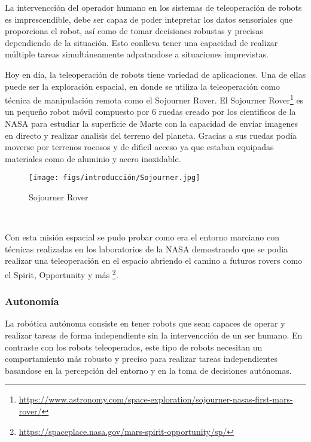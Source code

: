 La intervencción del operador humano en los sistemas de teleoperación de robots es imprescendible, debe ser capaz de poder intepretar los datos sensoriales que proporciona el robot, así como de 
tomar decisiones robustas y precisas dependiendo de la situación. Esto conlleva tener una capacidad de realizar múltiple tareas simultáneamente adpatandose a situaciones imprevistas. \newline

Hoy en día, la teleoperación de robots tiene variedad de aplicaciones. Una de ellas puede ser la exploración espacial, en donde se utiliza la teleoperación
como técnica de manipulación remota como el Sojourner Rover. El Sojourner Rover\footnote{\url{https://www.astronomy.com/space-exploration/sojourner-nasas-first-mars-rover/}} 
es un pequeño robot móvil compuesto por 6 ruedas creado por los cientificos de la NASA para estudiar 
la superficie de Marte con la capacidad de enviar imagenes en directo y realizar analisis del terreno del planeta. Gracias a sus ruedas podía moverse por terrenos rocosos y de dificil acceso
ya que estaban equipadas materiales como de aluminio y acero inoxidable. \newline

\begin{figure} [H]
  \begin{center}
    \texttt{[image: figs/introducción/Sojourner.jpg]}
  \end{center}
  \caption{Sojourner Rover}
  \label{fig:Sojourner}
\end{figure}\

Con esta misión espacial se pudo probar como era el entorno marciano con técnicas realizadas en los laboratorios de la NASA demostrando que se podia realizar una teleoperación en 
el espacio abriendo el camino a futuros rovers como el Spirit, Opportunity y más \footnote{\url{https://spaceplace.nasa.gov/mars-spirit-opportunity/sp/}}. 

\subsubsection{Autonomía}
\label{sec:subseccion}

La robótica autónoma consiste en tener robots que sean capaces de operar y realizar tareas de forma independiente sin la intervencción de un ser humano. En contraste con los 
robots teleoperados, este tipo de robots necesitan un comportamiento más robusto y preciso para realizar tareas independientes basandose en la percepción del entorno 
y en la toma de decisiones autónomas. \newline

